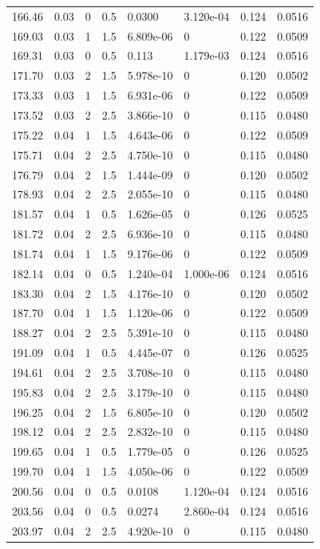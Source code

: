 \documentclass[preview]{standalone}
\begin{document}
{{{\begin{tabular}{L{1.2cm}C{1.2cm} C{0.3cm}C{0.5cm} C{1.4cm}C{1.4cm} C{1.4cm}C{1.4cm}}
  166.46  &  0.03  & 0     & 0.5 &  0.0300  & 3.120e-04  & 0.124 &  0.0516   \\ 
  169.03  &  0.03  & 1     & 1.5 &  6.809e-06  & 0  & 0.122 &  0.0509   \\ 
  169.31  &  0.03  & 0     & 0.5 &  0.113  & 1.179e-03  & 0.124 &  0.0516   \\ 
  171.70  &  0.03  & 2     & 1.5 &  5.978e-10  & 0  & 0.120 &  0.0502   \\ 
  173.33  &  0.03  & 1     & 1.5 &  6.931e-06  & 0  & 0.122 &  0.0509   \\ 
  173.52  &  0.03  & 2     & 2.5 &  3.866e-10  & 0  & 0.115 &  0.0480   \\ 
  175.22  &  0.04  & 1     & 1.5 &  4.643e-06  & 0  & 0.122 &  0.0509   \\ 
  175.71  &  0.04  & 2     & 2.5 &  4.750e-10  & 0  & 0.115 &  0.0480   \\ 
  176.79  &  0.04  & 2     & 1.5 &  1.444e-09  & 0  & 0.120 &  0.0502   \\ 
  178.93  &  0.04  & 2     & 2.5 &  2.055e-10  & 0  & 0.115 &  0.0480   \\ 
  181.57  &  0.04  & 1     & 0.5 &  1.626e-05  & 0  & 0.126 &  0.0525   \\ 
  181.72  &  0.04  & 2     & 2.5 &  6.936e-10  & 0  & 0.115 &  0.0480   \\ 
  181.74  &  0.04  & 1     & 1.5 &  9.176e-06  & 0  & 0.122 &  0.0509   \\ 
  182.14  &  0.04  & 0     & 0.5 &  1.240e-04  & 1.000e-06  & 0.124 &  0.0516   \\ 
  183.30  &  0.04  & 2     & 1.5 &  4.176e-10  & 0  & 0.120 &  0.0502   \\ 
  187.70  &  0.04  & 1     & 1.5 &  1.120e-06  & 0  & 0.122 &  0.0509   \\ 
  188.27  &  0.04  & 2     & 2.5 &  5.391e-10  & 0  & 0.115 &  0.0480   \\ 
  191.09  &  0.04  & 1     & 0.5 &  4.445e-07  & 0  & 0.126 &  0.0525   \\ 
  194.61  &  0.04  & 2     & 2.5 &  3.708e-10  & 0  & 0.115 &  0.0480   \\ 
  195.83  &  0.04  & 2     & 2.5 &  3.179e-10  & 0  & 0.115 &  0.0480   \\ 
  196.25  &  0.04  & 2     & 1.5 &  6.805e-10  & 0  & 0.120 &  0.0502   \\ 
  198.12  &  0.04  & 2     & 2.5 &  2.832e-10  & 0  & 0.115 &  0.0480   \\ 
  199.65  &  0.04  & 1     & 0.5 &  1.779e-05  & 0  & 0.126 &  0.0525   \\ 
  199.70  &  0.04  & 1     & 1.5 &  4.050e-06  & 0  & 0.122 &  0.0509   \\ 
  200.56  &  0.04  & 0     & 0.5 &  0.0108  & 1.120e-04  & 0.124 &  0.0516   \\ 
  203.56  &  0.04  & 0     & 0.5 &  0.0274  & 2.860e-04  & 0.124 &  0.0516   \\ 
  203.97  &  0.04  & 2     & 2.5 &  4.920e-10  & 0  & 0.115 &  0.0480   \\ 
\hline 
\end{tabular} 

}}}
\end{document}
